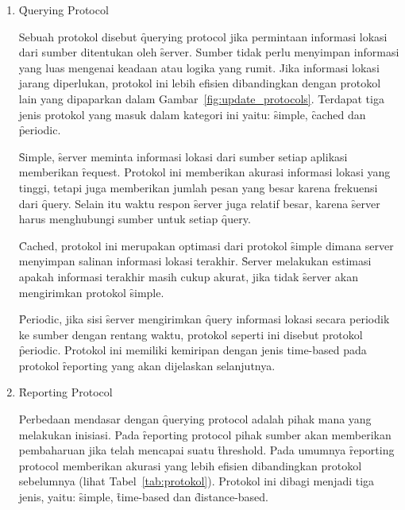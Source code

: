 \begin{enumerate}
  [noitemsep
  ,nolistsep
  ,leftmargin=0cm
  ,itemindent=.5cm
  ,listparindent=\parindent
  ]
  \item \f{Querying Protocol}

        Sebuah protokol disebut \f{querying protocol} jika permintaan informasi lokasi
        dari sumber ditentukan oleh \f{server}. Sumber tidak perlu menyimpan informasi
        yang luas mengenai keadaan atau logika yang rumit. Jika informasi lokasi jarang
        diperlukan, protokol ini lebih efisien dibandingkan dengan protokol lain yang
        dipaparkan dalam Gambar~\ref{fig:update_protocols}. Terdapat tiga jenis protokol
        yang masuk dalam kategori ini yaitu: \f{simple}, \f{cached} dan \f{periodic}.

        \f{Simple}, \f{server} meminta informasi lokasi dari sumber setiap aplikasi memberikan
        \f{request}. Protokol ini memberikan akurasi informasi lokasi yang tinggi, tetapi
        juga memberikan jumlah pesan yang besar karena frekuensi dari \f{query}. Selain
        itu waktu respon \f{server} juga relatif besar, karena \f{server} harus menghubungi
        sumber untuk setiap \f{query}.

        \f{Cached}, protokol ini merupakan optimasi dari protokol \f{simple} dimana
        server menyimpan salinan informasi lokasi terakhir. \f{Server}
        melakukan estimasi apakah informasi terakhir masih cukup akurat, jika tidak
        \f{server} akan mengirimkan protokol \f{simple}.

        \f{Periodic}, jika sisi \f{server} mengirimkan \f{query} informasi lokasi
        secara periodik ke sumber dengan rentang waktu, protokol seperti ini
        disebut protokol \f{periodic}. Protokol ini memiliki kemiripan dengan jenis
        time-based pada protokol \f{reporting} yang akan dijelaskan selanjutnya.

    \item \f{Reporting Protocol}

        Perbedaan mendasar dengan \f{querying protocol} adalah pihak mana yang melakukan
        inisiasi. Pada \f{reporting protocol} pihak sumber akan memberikan pembaharuan
        jika telah mencapai suatu \f{threshold}. Pada umumnya \f{reporting protocol}
        memberikan akurasi yang lebih efisien dibandingkan protokol sebelumnya (lihat
        Tabel~\ref{tab:protokol}). Protokol ini dibagi menjadi tiga jenis,
        yaitu: \f{simple}, \f{time-based} dan \f{distance-based}.


\end{enumerate}
